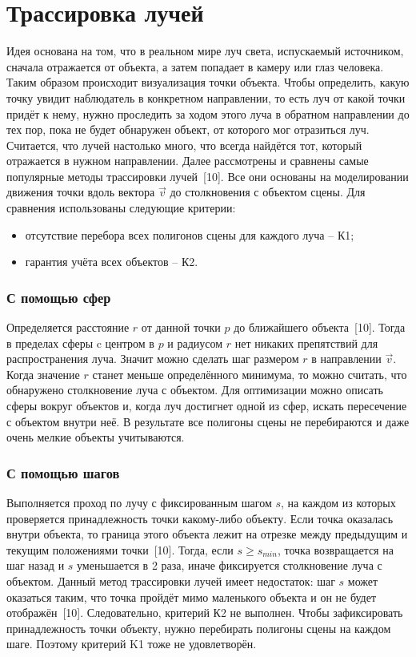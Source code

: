 \section{Трассировка лучей} {
    Идея основана на том, что в реальном мире луч света, испускаемый источником,
    сначала отражается от объекта, а затем попадает в камеру или глаз человека.
    Таким образом происходит визуализация точки объекта.
    Чтобы определить, какую точку увидит наблюдатель в конкретном направлении, то есть луч от какой точки придёт к нему, нужно проследить за ходом этого луча
    в обратном направлении до тех пор, пока не будет обнаружен объект,
    от которого мог отразиться луч.
    Считается, что лучей настолько много, что всегда найдётся тот,
    который отражается в нужном направлении.
    Далее рассмотрены и сравнены самые популярные методы трассировки лучей~[10].
    Все они основаны на моделировании движения точки вдоль вектора $\vec{v}$ до
    столкновения с объектом сцены.
    Для сравнения использованы следующие критерии:
    \begin{itemize}
        \item отсутствие перебора всех полигонов сцены для каждого луча -- К1;
        \item гарантия учёта всех объектов -- К2.
    \end{itemize}

    \subsubsection{С помощью сфер} {
        Определяется расстояние $r$ от данной точки $p$ до ближайшего объекта~[10].
        Тогда в пределах сферы c центром в $p$ и радиусом $r$ нет никаких
        препятствий для распространения луча.
        Значит можно сделать шаг размером $r$ в направлении $\vec{v}$.
        Когда значение $r$ станет меньше определённого минимума, то можно считать,
        что обнаружено столкновение луча с объектом.
        Для оптимизации можно описать сферы вокруг объектов и, когда луч достигнет
        одной из сфер, искать пересечение с объектом внутри неё.
        В результате все полигоны сцены не перебираются и даже очень мелкие объекты
        учитываются.
    }

    \subsubsection{С помощью шагов} {
        Выполняется проход по лучу с фиксированным шагом $s$,
        на каждом из которых
        проверяется принадлежность точки какому-либо объекту.
        Если точка оказалась внутри объекта, то граница этого объекта лежит на
        отрезке между предыдущим и текущим положениями точки~[10].
        Тогда, если $s \geq s_{min}$, точка возвращается на шаг назад и $s$
        уменьшается в 2 раза, иначе фиксируется столкновение луча с объектом.
        Данный метод трассировки лучей имеет недостаток:
        шаг $s$ может оказаться таким, что точка
        пройдёт мимо маленького объекта и он не будет отображён~[10].
        Следовательно, критерий К2 не выполнен.
        Чтобы зафиксировать принадлежность точки объекту, нужно перебирать
        полигоны сцены на каждом шаге.
        Поэтому критерий K1 тоже не удовлетворён.
    }
    
}
